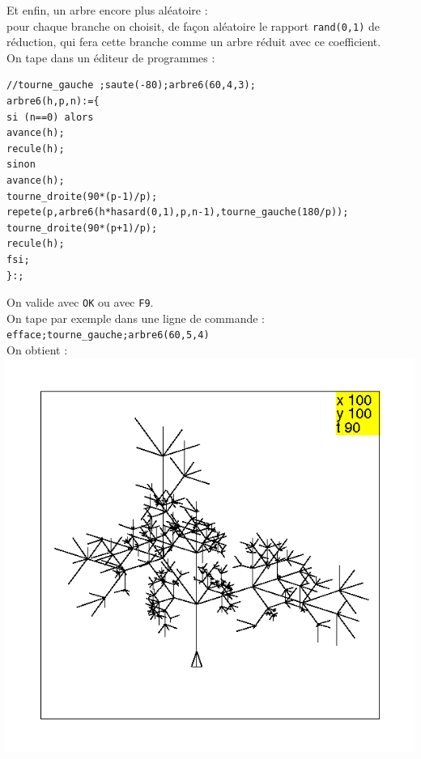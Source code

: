 \documentclass[a4paper,11pt]{book}
\begin{document}
Et enfin, un arbre encore plus al\'eatoire : \\
pour chaque branche on choisit, de fa\c{c}on al\'eatoire le rapport 
{\tt rand(0,1)} de r\'eduction, qui fera cette branche comme un arbre r\'eduit 
avec ce coefficient.\\
On tape dans un \'editeur de programmes :
\begin{verbatim}
//tourne_gauche ;saute(-80);arbre6(60,4,3);
arbre6(h,p,n):={
si (n==0) alors
avance(h);
recule(h);
sinon
avance(h);
tourne_droite(90*(p-1)/p);
repete(p,arbre6(h*hasard(0,1),p,n-1),tourne_gauche(180/p));
tourne_droite(90*(p+1)/p);
recule(h);
fsi;
}:;
\end{verbatim}
On valide avec {\tt OK} ou avec {\tt F9}.\\
On tape par exemple dans une ligne de commande :\\
{\tt efface;tourne\_gauche;arbre6(60,5,4)}\\
On obtient :\\
\includegraphics[width=\textwidth]{tortarb6}\\
\end{document}
